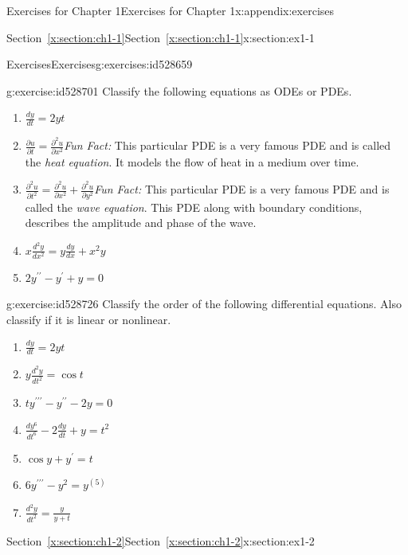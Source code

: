 \documentclass[oneside,10pt,]{book}
\newcommand{\xreffont}{\relax}
\numberwithin{equation}{section}
\numberwithin{equation}{section}
\begin{document}
\begin{appendixptx}{Exercises for Chapter 1}{}{Exercises for Chapter 1}{}{}{x:appendix:exercises}
\begin{sectionptx}{Section~{\xreffont\ref*{x:section:ch1-1}}}{}{Section~{\xreffont\ref*{x:section:ch1-1}}}{}{}{x:section:ex1-1}
\begin{exercises-subsection-numberless}{Exercises}{}{Exercises}{}{}{g:exercises:id528659}
\begin{divisionexercise}{6}{}{}{g:exercise:id528701}
Classify the following equations as ODEs or PDEs.%
%
\begin{enumerate}[label=(\alph*)]
\item{}\(\displaystyle \frac{dy}{dt}=2yt\)%
\item{}\(\frac{\partial u}{\partial t}=\frac{\partial^{2}u}{\partial x^{2}}\)\emph{Fun Fact:} This particular PDE is a very famous PDE and is called the \emph{heat equation}. It models the flow of heat in a medium over time.%
\item{}\(\frac{\partial^{2}u}{\partial t^{2}}=\frac{\partial^{2}u}{\partial x^{2}}+\frac{\partial^{2}u}{\partial y^{2}}\)\emph{Fun Fact:} This particular PDE is a very famous PDE and is called the \emph{wave equation}. This PDE along with boundary conditions, describes the amplitude and phase of the wave.%
\item{}\(\displaystyle x\frac{d^{2}y}{dx^{2}}=y\frac{dy}{dx}+x^{2}y\)%
\item{}\(\displaystyle 2y^{\prime\prime}-y^{\prime}+y=0\)%
\end{enumerate}
\end{divisionexercise}%
\begin{divisionexercise}{7}{}{}{g:exercise:id528726}%
Classify the order of the following differential equations. Also classify if it is linear or nonlinear.%
%
\begin{enumerate}[label=(\alph*)]
\item{}\(\displaystyle \frac{dy}{dt}=2yt\)%
\item{}\(\displaystyle y\frac{d^{2}y}{dt^{2}}=\cos t\)%
\item{}\(\displaystyle ty^{\prime\prime\prime}-y^{\prime\prime}-2y=0\)%
\item{}\(\displaystyle \frac{dy^{6}}{dt^{6}}-2\frac{dy}{dt}+y=t^{2}\)%
\item{}\(\displaystyle \cos y+y^{\prime}=t\)%
\item{}\(\displaystyle 6y^{\prime\prime\prime}-y^{2}=y^{(5)}\)%
\item{}\(\displaystyle \frac{d^{2}y}{dt^{2}}=\frac{y}{y+t}\)%
\end{enumerate}
\end{divisionexercise}%
\end{exercises-subsection-numberless}
\end{sectionptx}
%
%
\typeout{************************************************}
\typeout{Section B.2 Section~{\xreffont\ref*{x:section:ch1-2}}}
\typeout{************************************************}
%
\begin{sectionptx}{Section~{\xreffont\ref*{x:section:ch1-2}}}{}{Section~{\xreffont\ref*{x:section:ch1-2}}}{}{}{x:section:ex1-2}

\end{sectionptx}
\end{appendixptx}
\end{document}
